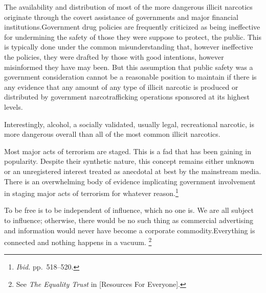 The availability and distribution of most of the more dangerous illicit narcotics originate through the covert assistance of governments and major financial institutions.\footnotecite[webb1996] Government drug policies are frequently criticized as being ineffective for undermining the safety of those they were suppose to protect, the public. This is typically done under the common misunderstanding that, however ineffective the policies, they were drafted by those with good intentions, however misinformed they have may been. But this assumption that public safety was a government consideration cannot be a reasonable position to maintain if there is any evidence that any amount of any type of illicit narcotic is produced or distributed by government narcotrafficking operations sponsored at its highest levels.

Interestingly, alcohol, a socially validated, usually legal, recreational narcotic, is more dangerous overall than all of the most common illicit narcotics.\footnotecite[extras={ See figure 2.}][nutt2010]


Most major acts of terrorism are staged. This is a fad that has been gaining in popularity. Despite their synthetic nature, this concept remains either unknown or an unregistered interest treated as anecdotal at best by the mainstream media. There is an overwhelming body of evidence implicating government involvement in staging major acts of terrorism for whatever reason.\footnotecite[extras={ p.~193.}][shirer1960]\footnote{{\it Ibid.} pp.~518--520.}\footnotecite[gourley2012]\footnotecite[harrit2009]\footnotecite[northwoods]\footnotecite[king2010]\footnotecite[chossudovsky2005]


To be free is to be independent of influence, which no one is. We are all subject to influence; otherwise, there would be no such thing as commercial advertising and information would never have become a corporate commodity.\footnotecite[santoso2008] Everything is connected and nothing happens in a vacuum. \footnote{See {\it The Equality Trust} in [Resources For Everyone].}

